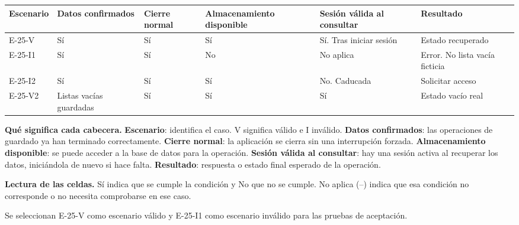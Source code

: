 \begingroup\fontsize{7.8}{11}\selectfont\setlength{\tabcolsep}{3pt}
\begin{tabularx}{\linewidth}{@{}*{6}{Y}@{}}\toprule
\textbf{Escenario} & \textbf{Datos confirmados} & \textbf{Cierre normal} & \textbf{Almacenamiento disponible} & \textbf{Sesión válida al consultar} & \textbf{Resultado}\\\midrule
E-25-V & Sí & Sí & Sí & Sí. Tras iniciar sesión & Estado recuperado\\[3pt]
E-25-I1 & Sí & Sí & No & No aplica & Error. No lista vacía ficticia\\[3pt]
E-25-I2 & Sí & Sí & Sí & No. Caducada & Solicitar acceso\\[3pt]
E-25-V2 & Listas vacías guardadas & Sí & Sí & Sí & Estado vacío real\\[3pt]
\bottomrule\end{tabularx}\endgroup\par
{\fontsize{9}{11}\selectfont\textbf{Qué significa cada cabecera.} \textbf{Escenario}: identifica el caso. V significa válido e I inválido. \textbf{Datos confirmados}: las operaciones de guardado ya han terminado correctamente. \textbf{Cierre normal}: la aplicación se cierra sin una interrupción forzada. \textbf{Almacenamiento disponible}: se puede acceder a la base de datos para la operación. \textbf{Sesión válida al consultar}: hay una sesión activa al recuperar los datos, iniciándola de nuevo si hace falta. \textbf{Resultado}: respuesta o estado final esperado de la operación.\par\textbf{Lectura de las celdas.} Sí indica que se cumple la condición y No que no se cumple. No aplica (--) indica que esa condición no corresponde o no necesita comprobarse en ese caso.\par}


Se seleccionan E-25-V como escenario válido y E-25-I1 como escenario inválido para las pruebas de aceptación.\par


